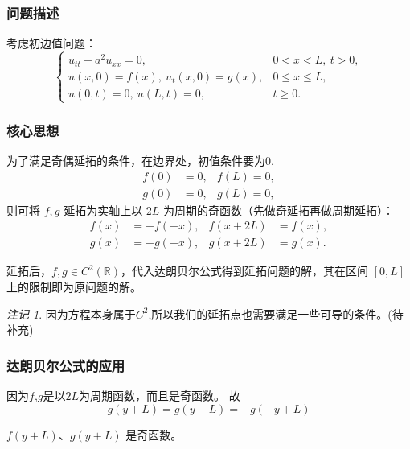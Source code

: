 \documentclass[12pt,a4paper]{article}
\numberwithin{subsection}{section}
\numberwithin{subsubsection}{subsection}
\theoremstyle{plain}
\theoremstyle{definition}
\theoremstyle{remark}
\newtheorem{remark}[theorem]{注记}
\begin{document}
\subsubsection{问题描述}
考虑初边值问题：
\begin{equation}
	\begin{cases}
		u_{tt} - a^2 u_{xx} = 0, & 0 < x < L, \ t > 0, \\
		u(x, 0) = f(x), \ u_t(x, 0) = g(x), & 0 \leq x \leq L, \\
		u(0, t) = 0, \ u(L, t) = 0, & t \geq 0.
	\end{cases}
\end{equation}


\subsubsection{核心思想}
为了满足奇偶延拓的条件，在边界处，初值条件要为0.
\begin{equation}
	\begin{aligned}
		f(0) & = 0, & f(L)  = 0, \\
		g(0) & =0, & g(L)  = 0,
	\end{aligned}
\end{equation}
则可将 \(f, g\) 延拓为实轴上以 \(2L\) 为周期的奇函数（先做奇延拓再做周期延拓）：
\begin{equation}
	\begin{aligned}
		f(x) &= -f(-x), & f(x + 2L) &= f(x), \\
		g(x) &= -g(-x), & g(x + 2L) &= g(x).
	\end{aligned}
\end{equation}

延拓后，\(f, g \in C^2(\mathbb{R})\)，代入达朗贝尔公式得到延拓问题的解，其在区间 \([0, L]\) 上的限制即为原问题的解。

\begin{remark}
因为方程本身属于$C^2$,所以我们的延拓点也需要满足一些可导的条件。(待补充)
\end{remark}


\subsubsection{达朗贝尔公式的应用}
因为$f$,$g$是以$2L$为周期函数，而且是奇函数。
故
\begin{equation}
g(y + L) = g(y - L) = -g(-y + L)
\end{equation}

$f(y + L)$、$g(y + L)$ 是奇函数。
\end{document}
